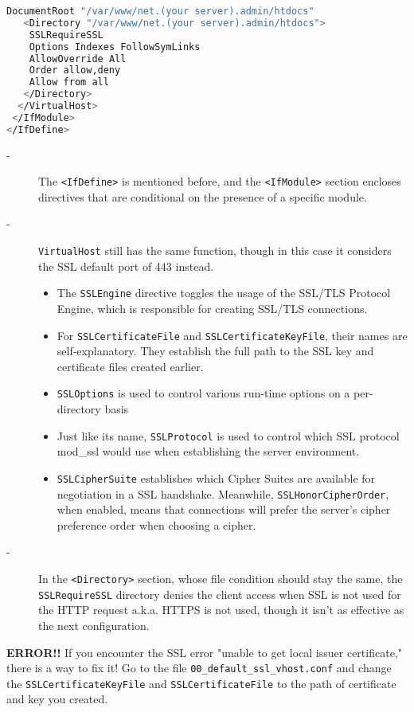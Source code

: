 \documentclass[11pt]{article}
\begin{document}
\begin {itemize}
\begin{enumerate}
\begin{lstlisting}[basicstyle=\ttfamily, backgroundcolor = \color{lightgray}, language = bash, xleftmargin = 0cm, framexleftmargin = 1em, framexrightmargin = 8em, showstringspaces=false]
   DocumentRoot "/var/www/net.(your server).admin/htdocs"
   <Directory "/var/www/net.(your server).admin/htdocs">
    SSLRequireSSL
    Options Indexes FollowSymLinks
    AllowOverride All
    Order allow,deny
    Allow from all
   </Directory>
  </VirtualHost>
 </IfModule>
</IfDefine>
\end{lstlisting}
    \begin{description}
      \item[-] The \verb|<IfDefine>| is mentioned before, and the \verb|<IfModule>| section encloses directives that are conditional on the presence of a specific module.
      \item[-] \verb|VirtualHost| still has the same function, though in this case it considers the SSL default port of 443 instead.
      \begin{itemize}
        \item The \verb|SSLEngine| directive toggles the usage of the SSL/TLS Protocol Engine, which is responsible for creating SSL/TLS connections.
        \item For \verb|SSLCertificateFile| and \verb|SSLCertificateKeyFile|, their names are self-explanatory. They establish the full path to the SSL key and certificate files created earlier.
        \item \verb|SSLOptions| is used to control various run-time options on a per-directory basis
        \item Just like its name, \verb|SSLProtocol| is used to control which SSL protocol mod\_ssl would use when establishing the server environment.
        \item \verb|SSLCipherSuite| establishes which Cipher Suites are available for negotiation in a SSL handshake. Meanwhile, \verb|SSLHonorCipherOrder|, when enabled, means that connections will prefer the server's cipher preference order when choosing a cipher.
      \end{itemize}
      \item[-] In the \verb|<Directory>| section, whose file condition should stay the same, the \verb|SSLRequireSSL| directory denies the client access when SSL is not used for the HTTP request a.k.a. HTTPS is not used, though it isn't as effective as the next configuration.
    \end{description}
    \textbf{ERROR!!} If you encounter the SSL error "unable to get local issuer certificate," there is a way to fix it! Go to the file \verb|00_default_ssl_vhost.conf| and change the \verb|SSLCertificateKeyFile| and \verb|SSLCertificateFile| to the path of certificate and key you created.
    

\end{enumerate}
\end{itemize}
\end{document}
